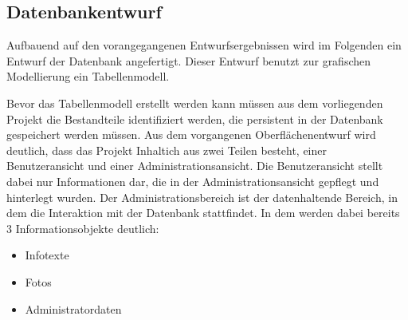 \subsection{Datenbankentwurf}
\label{sec:Datenbankentwurf}

Aufbauend auf den vorangegangenen Entwurfsergebnissen wird im Folgenden ein Entwurf der Datenbank angefertigt. Dieser Entwurf benutzt zur grafischen Modellierung ein Tabellenmodell\footnotemark.


Bevor das Tabellenmodell erstellt werden kann müssen aus dem vorliegenden Projekt die Bestandteile identifiziert werden, die persistent in der Datenbank gespeichert werden müssen.
Aus dem vorgangenen Oberflächenentwurf wird deutlich, dass das Projekt Inhaltich aus zwei Teilen besteht, einer Benutzeransicht und einer Administrationsansicht. Die Benutzeransicht stellt dabei nur Informationen dar, die in der Administrationsansicht gepflegt und hinterlegt wurden. Der Administrationsbereich ist der datenhaltende Bereich, in dem die Interaktion mit der Datenbank stattfindet. In dem  werden dabei bereits 3 Informationsobjekte deutlich:

\begin{itemize}
  \item Infotexte
  \item Fotos
  \item Administratordaten
\end{itemize}

